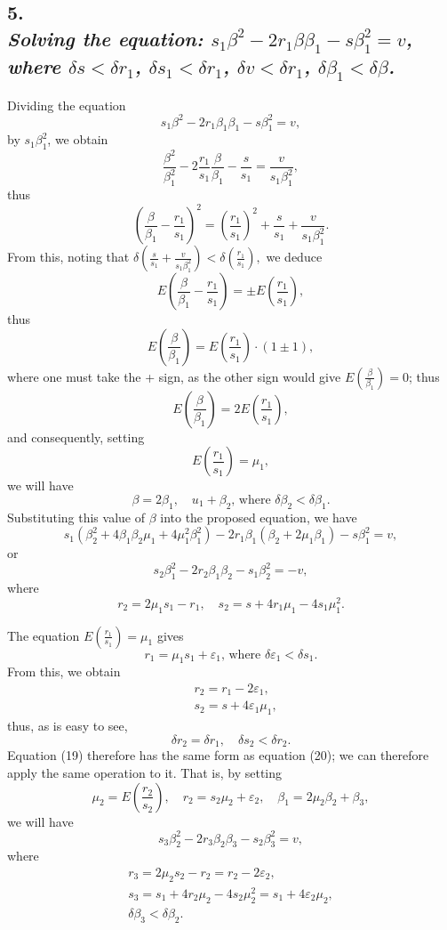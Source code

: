 \documentclass[oneside, 12 pt, leqno]{memoir}
\begin{document}
\subsection*{5.\\
{\scriptsize \textit{Solving the equation: \(s_1 \beta^2-2 r_1 \beta \beta_1-s \beta_1^2=v\), where \(\delta s<\delta r_1\), \(\delta s_1<\delta r_1\), \(\delta v<\delta r_1\), \(\delta \beta_1<\delta \beta \).}}}
%
Dividing the equation
\[\tag{19}s_1 \beta^2-2 r_1 \beta_1 \beta_1-s \beta_1^2=v,\]
by \(s_1 \beta_1^2\), we obtain
\[\frac{\beta^2}{\beta_1^2}-2 \frac{r_1}{s_1}\frac{\beta}{\beta_1}-\frac{s}{s_1}=\frac{v}{s_1 \beta_1^2},\]
thus
\[\left(\frac{\beta}{\beta_1}-\frac{r_1}{s_1}\right)^2=\left(\frac{r_1}{s_1}\right)^2+\frac{s}{s_1}+\frac{v}{s_1 \beta_1^2}.\]
From this, noting that \(\delta\left(\frac{s}{s_1}+\frac{v}{s_1 \beta_1^2}\right)<\delta\left(\frac{r_1}{s_1}\right),\)
we deduce
\[E\left(\frac{\beta}{\beta_1}-\frac{r_1}{s_1}\right)= \pm E\left(\frac{r_1}{s_1}\right),\]
thus
\[E\left(\frac{\beta}{\beta_1}\right)=E\left(\frac{r_1}{s_1}\right) \cdot(1 \pm 1),\]
where one must take the + sign, as the other sign would give \(E\left(\frac{\beta}{\beta_1}\right)=0\); thus
\[E\left(\frac{\beta}{\beta_1}\right)=2 E\left(\frac{r_1}{s_1}\right),\]
and consequently, setting
\[E\left(\frac{r_1}{s_1}\right)=\mu_1,\]
we will have
\[\beta=2 \beta_1, \quad u_1+\beta_2 \text {, where } \delta \beta_2<\delta \beta_1.\]
Substituting this value of \(\beta\) into the proposed equation, we have
\[s_1\left(\beta_2^2+4 \beta_1 \beta_2 \mu_1+4 \mu_1^2 \beta_1^2\right)-2 r_1 \beta_1\left(\beta_2+2 \mu_1 \beta_1\right)-s \beta_1^2=v,\]
or
\[\tag{20}s_2 \beta_1^2-2 r_2 \beta_1 \beta_2-s_1 \beta_2^2=-v,\]
where
\[r_2=2 \mu_1 s_1-r_1, \quad s_2=s+4 r_1 \mu_1-4 s_1 \mu_1^2.\]

The equation \(E\left(\frac{r_1}{s_1}\right)=\mu_1\) gives
\[r_1=\mu_1 s_1+\varepsilon_1 \text {, where } \delta \varepsilon_1<\delta s_1.\]
From this, we obtain
\[\begin{aligned}
& r_2=r_1-2 \varepsilon_1, \\
& s_2=s+4 \varepsilon_1 \mu_1,
\end{aligned}\]
thus, as is easy to see,
\[\delta r_2=\delta r_1, \quad \delta s_2<\delta r_2.\]
Equation (19) therefore has the same form as equation (20); we can therefore apply the same operation to it.  That is, by setting
\[\mu_2=E\left(\frac{r_2}{s_2}\right), \quad r_2=s_2 \mu_2+\varepsilon_2, \quad \beta_1=2 \mu_2 \beta_2+\beta_3,\]
we will have
\[s_3 \beta_2^{2}-2 r_3 \beta_2 \beta_3-s_2 \beta_3^2=v,\]
where
\[\begin{gathered}
r_3=2 \mu_2 s_2-r_2=r_2-2 \varepsilon_2, \\
s_3=s_1+4 r_2 \mu_2-4 s_2 \mu_2^2=s_1+4 \varepsilon_2 \mu_2, \\
\delta \beta_3<\delta \beta_2.
\end{gathered}\]
\end{document}
